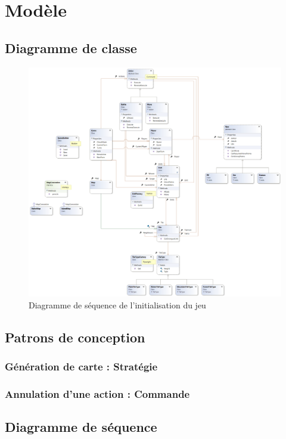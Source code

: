 \section{Modèle}

\subsection{Diagramme de classe}

\begin{figure}[h] 
  \centering
  \includegraphics[width=13cm]{schemas/ClassDiagram.png} 
  \caption{Diagramme de séquence de l'initialisation du jeu} 
  \label{sd_init}
\end{figure} 

\subsection{Patrons de conception}
\subsubsection{Génération de carte : Stratégie}
\subsubsection{Annulation d'une action : Commande}

\subsection{Diagramme de séquence}

